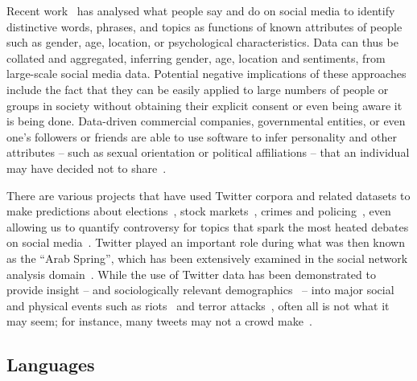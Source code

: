 Recent
work~\cite{blamey-et-al-2012,schwartz-et-al:2013,blamey-et-al-2013,oatley+crick:2014,oatley-et-al-soccogcomp2015,mostafa-et-al-ai2016}
has analysed what people say and do on social media to identify
distinctive words, phrases, and topics as functions of known
attributes of people such as gender, age, location, or psychological
characteristics. Data can thus be collated and aggregated, inferring
gender, age, location and sentiments, from large-scale social media
data. Potential negative implications of these approaches include the
fact that they can be easily applied to large numbers of people or
groups in society without obtaining their explicit consent or even
being aware it is being done. Data-driven commercial companies,
governmental entities, or even one's followers or friends are able to
use software to infer personality and other attributes -- such as
sexual orientation or political affiliations -- that an individual may
have decided not to share~\cite{lambiotte+kosinski:2014,postsm:2014}.

There are various projects that have used Twitter corpora and related
datasets to make predictions about
elections~\cite{tumasjan-et-al:2010}, stock
markets~\cite{zhang-et-al:2011}, crimes and
policing~\cite{gerber:2014,oatley+crick:2015}, even allowing us to
quantify controversy for topics that spark the most heated debates on
social media~\cite{garimella-et-al:2016}. Twitter played an important
role during what was then known as the ``Arab Spring'', which has been
extensively examined in the social network analysis
domain~\cite{lotan-et-al:2011,howard-et-al:2011,comunello+anzera:2012,wolfsfeld-et-al:2013,bruns-et-al:2013}.
While the use of Twitter data has been demonstrated to provide insight
-- and sociologically relevant demographics~\cite{sloan-et-al:2013} --
into major social and physical events such as
riots~\cite{procter-et-al:2013} and terror
attacks~\cite{burnap-et-al:2014}, often all is not what it may seem;
for instance, many tweets may not a crowd
make~\cite{liang-et-al:2013}.

\subsection{Languages}

